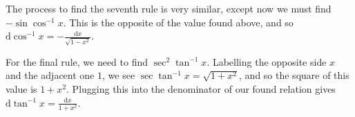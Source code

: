\documentclass[../the-road-to-reality.tex]{subfiles}
\begin{document}
\begin{questions}
\begin{solution}
	The process to find the seventh rule is very similar, except now we must find $-\sin\cos^{-1}{x}$. This is the opposite of the value found above, and so $\mathrm{d}\cos^{-1}{x} = -\frac{\mathrm{d}x}{\sqrt{1 - x^2}}$.

	For the final rule, we need to find $\sec^2\tan^{-1}{x}$. Labelling the opposite side $x$ and the adjacent one $1$, we see $\sec{\tan^{-1}{x}} = \sqrt{1 + x^2}$, and so the square of this value is $1 + x^2$. Plugging this into the denominator of our found relation gives $\mathrm{d}\tan^{-1}{x} = \frac{\mathrm{d}x}{1 + x^2}$.
\end{solution}

\end{questions}
\end{document}
